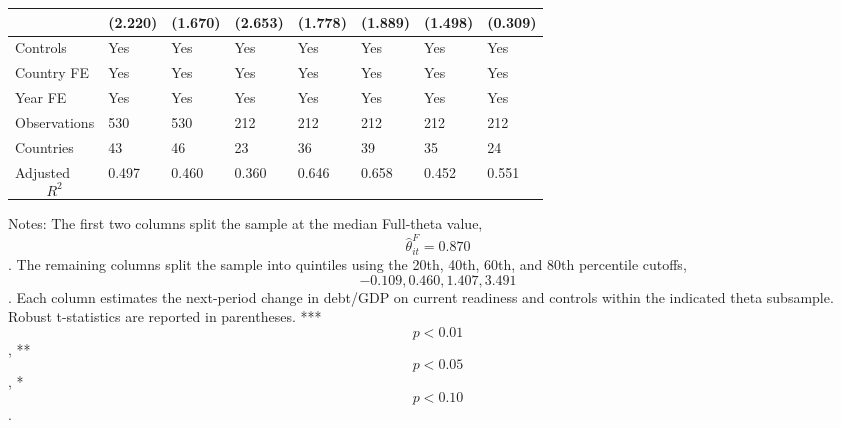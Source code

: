 \begin{table}[H]
\begin{threeparttable}
\begin{tabularx}{\textwidth}{lYYYYYYY}
  & (2.220) & (1.670) & (2.653) & (1.778) & (1.889) & (1.498) & (0.309) \\
\midrule
Controls & Yes & Yes & Yes & Yes & Yes & Yes & Yes \\
Country FE & Yes & Yes & Yes & Yes & Yes & Yes & Yes \\
Year FE & Yes & Yes & Yes & Yes & Yes & Yes & Yes \\
Observations & 530 & 530 & 212 & 212 & 212 & 212 & 212 \\
Countries & 43 & 46 & 23 & 36 & 39 & 35 & 24 \\
Adjusted $$R^2$$ & 0.497 & 0.460 & 0.360 & 0.646 & 0.658 & 0.452 & 0.551 \\
\bottomrule
\end{tabularx}
\begin{tablenotes}[flushleft]\footnotesize
\item Notes: The first two columns split the sample at the median Full-theta value, $$\widehat{\theta}^{F}_{it}=0.870$$. The remaining columns split the sample into quintiles using the 20th, 40th, 60th, and 80th percentile cutoffs, $$-0.109, 0.460, 1.407, 3.491$$. Each column estimates the next-period change in debt/GDP on current readiness and controls within the indicated theta subsample. Robust t-statistics are reported in parentheses. *** $$p<0.01$$, ** $$p<0.05$$, * $$p<0.10$$.
\end{tablenotes}
\end{threeparttable}
\end{table}
